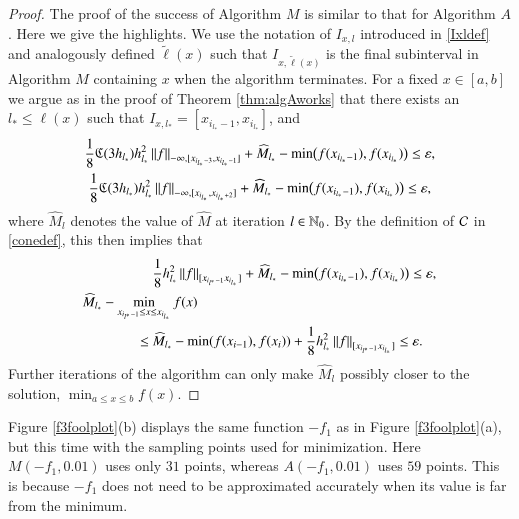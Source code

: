 \documentclass[review]{elsarticle}
\newcommand{\abstol}{\varepsilon}
\theoremstyle{definition}
\newcommand{\tell}{\tilde{\ell}}
\newcommand{\hM}{\widehat{M}}
\newcommand{\minfii}{\min(f(x_{i-1}), f(x_i))} %
\begin{document}
\begin{proof}
	The proof of the success of Algorithm $M$ is similar to that for Algorithm $A$. Here
	we give the highlights.     We use the notation of $I_{x,l}$ introduced in \eqref{Ixldef}
	and analogously defined $\tell(x)$ such that $I_{x,\tell(x)}$ is the final subinterval in
	Algorithm $M$ containing $x$ when the algorithm terminates.   For a fixed $x \in
	[a,b]$ we argue as in the proof of Theorem \ref{thm:algAworks} that there exists an
	$l_{*} \le \ell(x)$ such that $I_{x,l_*} =[x_{i_{l_*}-1},x_{i_{l_*}}]$, and
	\begin{gather*}
	\frac{1} 8 \fC(3h_{l_*}) h_{l_*}^2 \norm[-\infty,{[x_{i_{l_*}-3},x_{i_{l_*}-1}]}]{f} + \hM_{l_*}
	-  \min\bigl(f(x_{i_{l_*}-1}),f(x_{i_{l_*}})\bigr)   \le \abstol , \\
	\frac{1} 8 \fC(3h_{l_*}) h_{l_*}^2 \norm[-\infty,{[x_{i_{l_*}},x_{i_{l_*}+2}]}]{f} +  \hM_{l_*}
	-  \min\bigl(f(x_{i_{l_*}-1}),f(x_{i_{l_*}})\bigr)   \le \abstol,
	\end{gather*}
	where $ \hM_{l}$ denotes the value of $\hM$ at iteration $l \in \mathbb{N}_{0}$.  By the
	definition of $\mathcal{C}$ in \eqref{conedef}, this then implies that
	\begin{align}
	\nonumber
	 &	\frac{1}{8} h_{l_*}^2 \norm[{[x_{i_{l^*}-1} x_{i_{l_*}}]}]{f} + \hM_{l_*} -
	 \min\bigl(f(x_{i_{l_*}-1}),f(x_{i_{l_*}})\bigr)   \le \abstol,
	\\	\MoveEqLeft[5]{\hM_{l_*} - \min_{x_{i_{l^*}-1} \le x \le x_{i_{l_*}}} f(x) } \nonumber
	\\ \le \ & \hM_{l_*}  - \minfii + \frac{1}{8} h_{l_*}^2\norm[{[x_{i_{l^*}-1} x_{i_{l_*}}]}]{f} \le
	\abstol. \label{herrtogether}
	\end{align}
Further iterations of the algorithm can only make $\hM_{l}$ possibly closer to the
solution, $\min_{a \le x \le b} f(x) $.
\end{proof}

Figure \ref{f3foolplot}(b) displays the same function $-f_1$ as in
Figure \ref{f3foolplot}(a), but this time with the sampling points used for
minimization. Here $M(-f_1,0.01)$ uses only $31$ points, whereas
$A(-f_1,0.01)$ uses $59$ points. This is because $-f_1$ does not need to be
approximated accurately when its value is far from the minimum.
\end{document}
